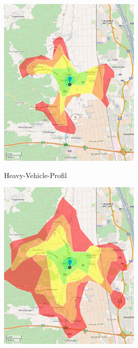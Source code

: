 \begin{figure}[H]
\centering
\begin{subfigure}{0.49\textwidth}
\centering
\includegraphics[width = 0.75\textwidth]{../media/isohgv.png} \\
\caption{Heavy-Vehicle-Profil}
\label{fig:isohgv}
\end{subfigure}
\begin{subfigure}{0.49\textwidth}
\centering
\includegraphics[width = 0.75\textwidth]{../media/isocar.png} \\

\end{subfigure}
\end{figure}
